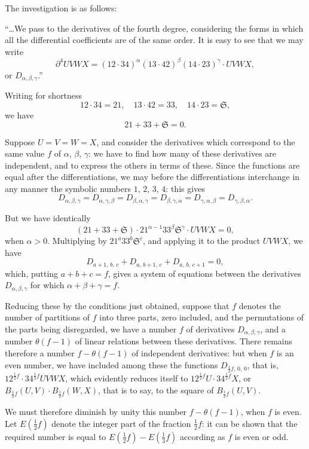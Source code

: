 \documentclass[11pt,a4paper]{article}
\theoremstyle{definition}
\begin{document}
The investigation is as follows:

``\ldots We pass to the derivatives of the fourth degree, considering the forms in which all the differential coefficients are of the same order. It is easy to see that we may write
\[
\partial^4 UVWX = (12 \cdot 34)^\alpha (13 \cdot 42)^\beta (14 \cdot 23)^\gamma \cdot UVWX,
\]
or $D_{\alpha,\beta,\gamma}$.''

\medskip

Writing for shortness
\[
12 \cdot 34 = 21, \quad 13 \cdot 42 = 33, \quad 14 \cdot 23 = \mathfrak{S},
\]
we have
\[
21 + 33 + \mathfrak{S} = 0.
\]

Suppose $U = V = W = X$, and consider the derivatives which correspond to the same value $f$ of $\alpha$, $\beta$, $\gamma$: we have to find how many of these derivatives are independent, and to express the others in terms of these. Since the functions are equal after the differentiations, we may before the differentiations interchange in any manner the symbolic numbers $1$, $2$, $3$, $4$: this gives
\[
D_{\alpha,\beta,\gamma} = D_{\alpha,\gamma,\beta} = D_{\beta,\alpha,\gamma} = D_{\beta,\gamma,\alpha} = D_{\gamma,\alpha,\beta} = D_{\gamma,\beta,\alpha}.
\]

But we have identically
\[
(21 + 33 + \mathfrak{S}) \cdot 21^{\alpha-1} 33^\beta \mathfrak{S}^\gamma \cdot UVWX = 0,
\]
when $\alpha > 0$. Multiplying by $21^a 33^b \mathfrak{S}^c$, and applying it to the product $UVWX$, we have
\[
D_{a+1,\,b,\,c} + D_{a,\,b+1,\,c} + D_{a,\,b,\,c+1} = 0,
\]
which, putting $a + b + c = f$, gives a system of equations between the derivatives $D_{\alpha,\beta,\gamma}$ for which $\alpha + \beta + \gamma = f$.

Reducing these by the conditions just obtained, suppose that $f$ denotes the number of partitions of $f$ into three parts, zero included, and the permutations of the parts being disregarded, we have a number $f$ of derivatives $D_{\alpha,\beta,\gamma}$, and a number $\theta(f - 1)$ of linear relations between these derivatives. There remains therefore a number $f - \theta(f - 1)$ of independent derivatives: but when $f$ is an even number, we have included among these the functions $D_{\frac{1}{2}f,\,0,\,0}$, that is, $12^{\frac{1}{2}f} \cdot 34^{\frac{1}{2}f}UVWX$, which evidently reduces itself to $12^{\frac{1}{2}f}U \cdot 34^{\frac{1}{2}f}X$, or $B_{\frac{1}{2}f}(U,V) \cdot B_{\frac{1}{2}f}(W,X)$, that is to say, to the square of $B_{\frac{1}{2}f}(U,V)$.

We must therefore diminish by unity this number $f - \theta(f - 1)$, when $f$ is even. Let $E(\frac{1}{2}f)$ denote the integer part of the fraction $\frac{1}{2}f$: it can be shown that the required number is equal to $E(\frac{1}{2}f) - E(\frac{1}{3}f)$ according as $f$ is even or odd.
\end{document}
